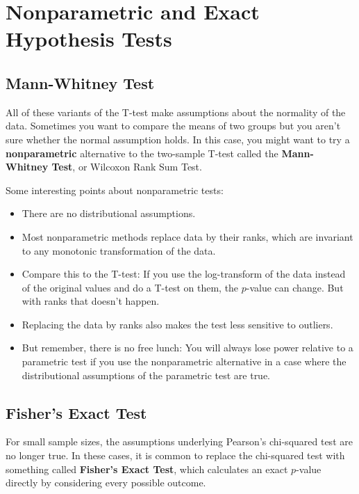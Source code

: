 \chapter{Nonparametric and Exact Hypothesis Tests}


\section{Mann-Whitney Test}

All of these variants of the T-test make assumptions about the normality of the data. Sometimes you want to compare the means of two groups but you aren't sure whether the normal assumption holds. In this case, you might want to try a \textbf{nonparametric} alternative to the two-sample T-test called the \textbf{Mann-Whitney Test}, or Wilcoxon Rank Sum Test. 

Some interesting points about nonparametric tests:
\begin{itemize}
\item There are no distributional assumptions.
\item Most nonparametric methods replace data by their ranks, which are invariant to any monotonic transformation of the data.
\item Compare this to the T-test: If you use the log-transform of the data instead of the original values and do a T-test on them, the $p$-value can change. But with ranks that doesn't happen.
\item Replacing the data by ranks also makes the test less sensitive to outliers.
\item But remember, there is no free lunch: You will always lose power relative to a parametric test if you use the nonparametric alternative in a case where the distributional assumptions of the parametric test are true.
\end{itemize}


\section{Fisher's Exact Test}

For small sample sizes, the assumptions underlying Pearson's chi-squared test are no longer true. In these cases, it is common to replace the chi-squared test with something called \textbf{Fisher's Exact Test}, which calculates an exact $p$-value directly by considering every possible outcome. 

